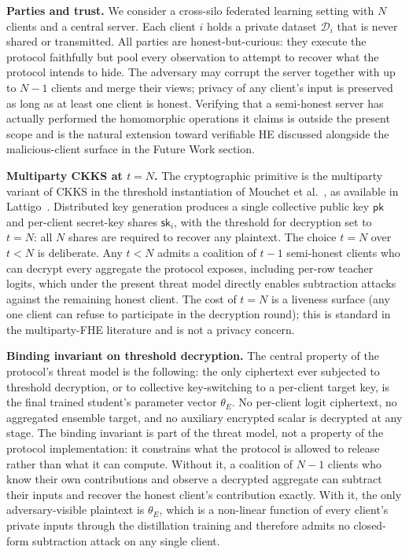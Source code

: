 \par\noindent\textbf{Parties and trust.} We consider a cross-silo federated learning setting with $N$ clients and a central server. Each client $i$ holds a private dataset $\mathcal{D}_i$ that is never shared or transmitted. All parties are honest-but-curious: they execute the protocol faithfully but pool every observation to attempt to recover what the protocol intends to hide. The adversary may corrupt the server together with up to $N{-}1$ clients and merge their views; privacy of any client's input is preserved as long as at least one client is honest. Verifying that a semi-honest server has actually performed the homomorphic operations it claims is outside the present scope and is the natural extension toward verifiable HE discussed alongside the malicious-client surface in the Future Work section.

\par\noindent\textbf{Multiparty CKKS at $t{=}N$.} The cryptographic primitive is the multiparty variant of CKKS in the threshold instantiation of Mouchet et al.~\cite{mouchet2021multiparty}, as available in Lattigo~\cite{lattigo}. Distributed key generation produces a single collective public key $\mathsf{pk}$ and per-client secret-key shares $\mathsf{sk}_i$, with the threshold for decryption set to $t{=}N$: all $N$ shares are required to recover any plaintext. The choice $t{=}N$ over $t < N$ is deliberate. Any $t < N$ admits a coalition of $t{-}1$ semi-honest clients who can decrypt every aggregate the protocol exposes, including per-row teacher logits, which under the present threat model directly enables subtraction attacks against the remaining honest client. The cost of $t{=}N$ is a liveness surface (any one client can refuse to participate in the decryption round); this is standard in the multiparty-FHE literature and is not a privacy concern.

\par\noindent\textbf{Binding invariant on threshold decryption.} The central property of the protocol's threat model is the following: the only ciphertext ever subjected to threshold decryption, or to collective key-switching to a per-client target key, is the final trained student's parameter vector $\theta_E$. No per-client logit ciphertext, no aggregated ensemble target, and no auxiliary encrypted scalar is decrypted at any stage. The binding invariant is part of the threat model, not a property of the protocol implementation: it constrains what the protocol is allowed to release rather than what it can compute. Without it, a coalition of $N{-}1$ clients who know their own contributions and observe a decrypted aggregate can subtract their inputs and recover the honest client's contribution exactly. With it, the only adversary-visible plaintext is $\theta_E$, which is a non-linear function of every client's private inputs through the distillation training and therefore admits no closed-form subtraction attack on any single client.

